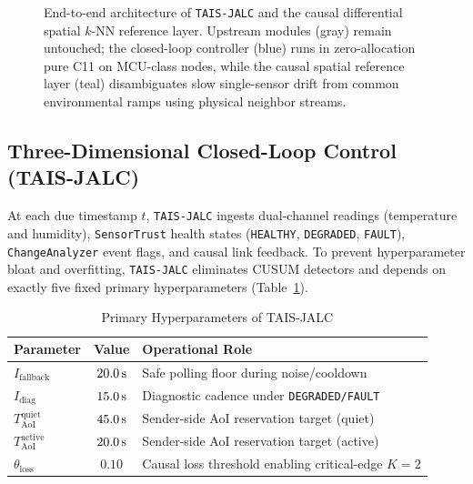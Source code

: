 \documentclass[journal,twoside,web]{ieeecolor}
\begin{document}
\begin{figure}[t]
{%
}
\caption{End-to-end architecture of \texttt{TAIS-JALC} and the causal differential spatial $k$-NN reference layer. Upstream modules (gray) remain untouched; the closed-loop controller (blue) runs in zero-allocation pure C11 on MCU-class nodes, while the causal spatial reference layer (teal) disambiguates slow single-sensor drift from common environmental ramps using physical neighbor streams.}
\label{fig:arch}
\end{figure}

\subsection{Three-Dimensional Closed-Loop Control (TAIS-JALC)}
At each due timestamp $t$, \texttt{TAIS-JALC} ingests dual-channel readings (temperature and humidity), \texttt{SensorTrust} health states (\texttt{HEALTHY}, \texttt{DEGRADED}, \texttt{FAULT}), \texttt{ChangeAnalyzer} event flags, and causal link feedback. To prevent hyperparameter bloat and overfitting, \texttt{TAIS-JALC} eliminates CUSUM detectors and depends on exactly five fixed primary hyperparameters (Table~\ref{tab:params}).

\begin{table}[t]
\centering
\caption{Primary Hyperparameters of TAIS-JALC}
\label{tab:params}
\footnotesize
\begin{tabular}{@{}lcl@{}}
\toprule
Parameter & Value & Operational Role \\
\midrule
$I_{\text{fallback}}$ & $20.0\text{\,s}$ & Safe polling floor during noise/cooldown \\
$I_{\text{diag}}$ & $15.0\text{\,s}$ & Diagnostic cadence under \texttt{DEGRADED/FAULT} \\
$T_{\text{AoI}}^{\text{quiet}}$ & $45.0\text{\,s}$ & Sender-side AoI reservation target (quiet) \\
$T_{\text{AoI}}^{\text{active}}$ & $20.0\text{\,s}$ & Sender-side AoI reservation target (active) \\
$\theta_{\text{loss}}$ & $0.10$ & Causal loss threshold enabling critical-edge $K{=}2$ \\
\bottomrule
\end{tabular}
\end{table}
\end{document}
